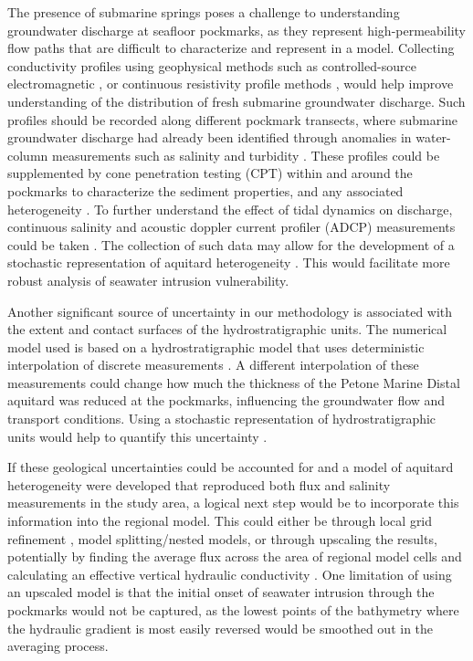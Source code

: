 \documentclass[pdflatex,sn-apa]{sn-jnl}%
\begin{document}
The presence of submarine springs poses a challenge to understanding groundwater discharge at seafloor pockmarks,
as they represent high-permeability flow paths that are difficult to characterize and represent in a model.
Collecting conductivity profiles using geophysical methods such as controlled-source electromagnetic \citep{gustafson_aquifer_2019, micallef_3d_2020},
or continuous resistivity profile methods \citep{becker_locating_2023}, would help improve understanding of the distribution of fresh submarine groundwater discharge.
Such profiles should be recorded along different pockmark transects,
where submarine groundwater discharge had already been identified through anomalies in water-column measurements such as salinity and turbidity \citep{hoffmann_fresh_2023}.
These profiles could be supplemented by cone penetration testing (CPT) within and around the pockmarks to characterize the sediment properties,
and any associated heterogeneity \citep{reusch_giant_2015}.
To further understand the effect of tidal dynamics on discharge, continuous salinity and acoustic doppler current profiler (ADCP) measurements could be taken \citep{poulsen_detecting_2015}.
The collection of such data may allow for the development of a stochastic representation of aquitard heterogeneity \citep{van_leer_investigating_2025}.
This would facilitate more robust analysis of seawater intrusion vulnerability.

Another significant source of uncertainty in our methodology is associated with the extent and contact surfaces of the hydrostratigraphic units.
The numerical model used is based on a hydrostratigraphic model that uses deterministic interpolation of discrete measurements \citep{begg_revised_2023}.
A different interpolation of these measurements could change how much the thickness of the Petone Marine Distal aquitard was reduced at the pockmarks, influencing the groundwater flow and transport conditions.
Using a stochastic representation of hydrostratigraphic units would help to quantify this uncertainty \citep{de_la_varga_gempy_2019, haehnel_development_2024, bardot_seamless_2025}.

If these geological uncertainties could be accounted for and a model of aquitard heterogeneity were developed that reproduced both flux and salinity measurements in the study area,
a logical next step would be to incorporate this information into the regional model.
This could either be through local grid refinement \citep{hughes_flopy_2024}, model splitting/nested models,
or through upscaling the results, potentially by finding the average flux across the area of regional model cells and calculating an effective vertical hydraulic conductivity \citep{van_leer_estimating_2023}.
One limitation of using an upscaled model is that the initial onset of seawater intrusion through the pockmarks would not be captured,
as the lowest points of the bathymetry where the hydraulic gradient is most easily reversed would be smoothed out in the averaging process.
\end{document}
